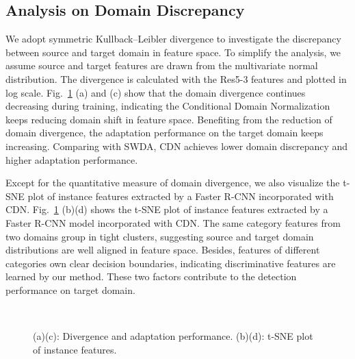 \documentclass[runningheads]{llncs}
\begin{document}
\subsection{Analysis on Domain Discrepancy}
We adopt symmetric Kullback–Leibler divergence to investigate the discrepancy between source and target domain in feature space.
To simplify the analysis, we assume source and target features are drawn from the multivariate normal distribution.
The divergence is calculated with the Res5-3 features and plotted in log scale.
Fig.~\ref{fig:vis_feat_divergence} (a) and (c) show that the domain divergence continues decreasing during training, indicating the Conditional Domain Normalization keeps reducing domain shift in feature space.
Benefiting from the reduction of domain divergence, the adaptation performance on the target domain keeps increasing.
Comparing with SWDA, CDN achieves lower domain discrepancy and higher adaptation performance.



Except for the quantitative measure of domain divergence, we also visualize the t-SNE plot of instance features extracted by a Faster R-CNN incorporated with CDN.
Fig.~\ref{fig:vis_feat_divergence} (b)(d) shows the t-SNE plot of instance features extracted by a Faster R-CNN model incorporated with CDN.
The same category features from two domains group in tight clusters, suggesting source and target domain distributions are well aligned in feature space.
Besides, features of different categories own clear decision boundaries, indicating discriminative features are learned by our method. These two factors contribute to the detection performance on target domain.
\begin{figure}[!th]
  \centering
    \\ [-1.2ex]
  \caption{(a)(c): Divergence and adaptation performance. (b)(d): t-SNE plot of instance features.
}
  \label{fig:vis_feat_divergence}
\end{figure}
\end{document}
